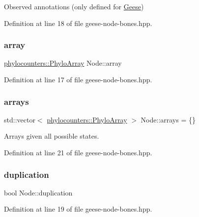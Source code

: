 Observed annotations (only defined for \hyperlink{class_geese}{Geese}) 



Definition at line 18 of file geese-\/node-\/bones.\+hpp.

\mbox{\label{class_node_a86d6575dd1ad7ab0cb02c6e6202b0608}} 
\subsubsection{\texorpdfstring{array}{array}}
{\footnotesize\ttfamily \hyperlink{namespacebarry_1_1counters_1_1phylo_abd293bf65e494e903639fb5fb2c91604}{phylocounters\+::\+Phylo\+Array} Node\+::array}



Definition at line 17 of file geese-\/node-\/bones.\+hpp.

\mbox{\label{class_node_a269d78db10090d106c697d7c73bac9c7}} 
\subsubsection{\texorpdfstring{arrays}{arrays}}
{\footnotesize\ttfamily std\+::vector$<$ \hyperlink{namespacebarry_1_1counters_1_1phylo_abd293bf65e494e903639fb5fb2c91604}{phylocounters\+::\+Phylo\+Array} $>$ Node\+::arrays = \{\}}



Arrays given all possible states. 



Definition at line 21 of file geese-\/node-\/bones.\+hpp.

\mbox{\label{class_node_a3129939e8a58c055cb5ad8db8be6b10a}} 
\subsubsection{\texorpdfstring{duplication}{duplication}}
{\footnotesize\ttfamily bool Node\+::duplication}



Definition at line 19 of file geese-\/node-\/bones.\+hpp.

\mbox{\label{class_node_adb90577d9d796c4ccbccf41ce2efc6c9}} 
